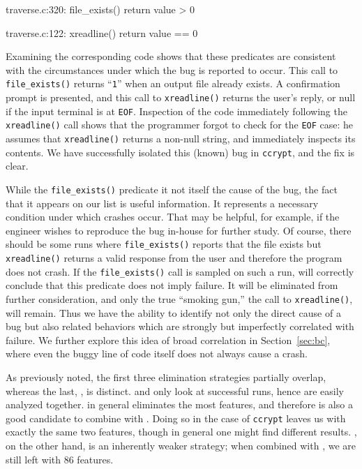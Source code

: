 \begin{features}
\item traverse.c:320: file\_exists() return value > 0
\item traverse.c:122: xreadline() return value == 0
\end{features}

Examining the corresponding code shows that these predicates are
consistent with the circumstances under which the bug is reported to
occur.  This call to \texttt{file\_exists()} returns ``{\tt 1}'' when an output
file already exists.  A confirmation prompt is presented, and this
call to \texttt{xreadline()} returns the user's reply, or null if the
input terminal is at \texttt{EOF}.  Inspection of the code immediately
following the \texttt{xreadline()} call shows that the programmer
forgot to check for the \texttt{EOF} case: he assumes that
\texttt{xreadline()} returns a non-null string, and immediately
inspects its contents.  We have successfully isolated this (known) bug
in \texttt{ccrypt}, and the fix is clear.

While the \texttt{file\_exists()} predicate it not itself the cause of
the bug, the fact that it appears on our list is useful information.
It represents a necessary condition under which crashes occur.  That
may be helpful, for example, if the engineer wishes to reproduce the
bug in-house for further study.  Of course, there should be some runs
where \texttt{file\_exists()} reports that the file exists but
\texttt{xreadline()} returns a valid response from the user and
therefore the program does not crash.  If the \texttt{file\_exists()}
call is sampled on such a run,  will correctly conclude that this predicate does not
imply failure.  It will be eliminated from further consideration, and
only the true ``smoking gun,'' the call to \texttt{xreadline()}, will
remain.  Thus we have the ability to identify not only the direct
cause of a bug but also related behaviors which are strongly but
imperfectly correlated with failure.  We further explore this idea of
broad correlation in Section~\ref{sec:bc}, where even the buggy line
of code itself does not always cause a crash.

As previously noted, the first three elimination strategies partially
overlap, whereas the last, , is
distinct.   and  only look at successful runs, hence are easily
analyzed together.   in general
eliminates the most features, and therefore is also a good candidate
to combine with .  Doing so in the
case of \texttt{ccrypt} leaves us with exactly the same two features,
though in general one might find different results.  , on the other hand, is an inherently
weaker strategy; when combined with ,
we are still left with 86 features.

